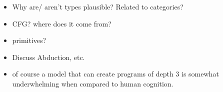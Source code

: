 \subsubsection{}
\begin{itemize}
    \item Why are/ aren't types plausible? Related to categories?
    \item CFG? where does it come from?
    \item primitives?
    \item Discuss Abduction, etc. 
    \item of course a model that can create programs of depth 3 is somewhat underwhelming when compared to human cognition. 
\end{itemize}
















































































